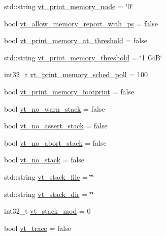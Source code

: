 \begin{DoxyCompactItemize}
\item 
std\+::string \hyperlink{structvt_1_1arguments_1_1_app_config_a4273792bc9a8537b18549d54d58417dd}{vt\+\_\+print\+\_\+memory\+\_\+node} = \char`\"{}0\char`\"{}
\item 
bool \hyperlink{structvt_1_1arguments_1_1_app_config_a40e8cdecd312fab611e262b12324d1bd}{vt\+\_\+allow\+\_\+memory\+\_\+report\+\_\+with\+\_\+ps} = false
\item 
bool \hyperlink{structvt_1_1arguments_1_1_app_config_a7f53d72ccd7261b0e959fdc8d86df3a3}{vt\+\_\+print\+\_\+memory\+\_\+at\+\_\+threshold} = false
\item 
std\+::string \hyperlink{structvt_1_1arguments_1_1_app_config_a3f564c6296069d6cf478a3f43ba9e8a4}{vt\+\_\+print\+\_\+memory\+\_\+threshold} = \char`\"{}1 GiB\char`\"{}
\item 
int32\+\_\+t \hyperlink{structvt_1_1arguments_1_1_app_config_af139aee07bf04d392501a4ee19478e31}{vt\+\_\+print\+\_\+memory\+\_\+sched\+\_\+poll} = 100
\item 
bool \hyperlink{structvt_1_1arguments_1_1_app_config_a02c45d00245e26942512287e048489a0}{vt\+\_\+print\+\_\+memory\+\_\+footprint} = false
\item 
bool \hyperlink{structvt_1_1arguments_1_1_app_config_a745524c2e7ac750835940972cdebf3c3}{vt\+\_\+no\+\_\+warn\+\_\+stack} = false
\item 
bool \hyperlink{structvt_1_1arguments_1_1_app_config_af5a38d00691ff72e08847ab5091f6345}{vt\+\_\+no\+\_\+assert\+\_\+stack} = false
\item 
bool \hyperlink{structvt_1_1arguments_1_1_app_config_a47012ebf82f55c03e8659e1df32ebe58}{vt\+\_\+no\+\_\+abort\+\_\+stack} = false
\item 
bool \hyperlink{structvt_1_1arguments_1_1_app_config_a9738d4749047b9a796d7db8a20e29182}{vt\+\_\+no\+\_\+stack} = false
\item 
std\+::string \hyperlink{structvt_1_1arguments_1_1_app_config_a8230bcba38ca9003f8cd507886572743}{vt\+\_\+stack\+\_\+file} = \char`\"{}\char`\"{}
\item 
std\+::string \hyperlink{structvt_1_1arguments_1_1_app_config_a364ee3b9e5ed25590d1c4dea55731e6c}{vt\+\_\+stack\+\_\+dir} = \char`\"{}\char`\"{}
\item 
int32\+\_\+t \hyperlink{structvt_1_1arguments_1_1_app_config_aa93f6ff7f613f402638deab33cc28adb}{vt\+\_\+stack\+\_\+mod} = 0
\item 
bool \hyperlink{structvt_1_1arguments_1_1_app_config_a863d6b2a20ba63ac85f4de2bd8cbe75c}{vt\+\_\+trace} = false

\end{DoxyCompactItemize}
